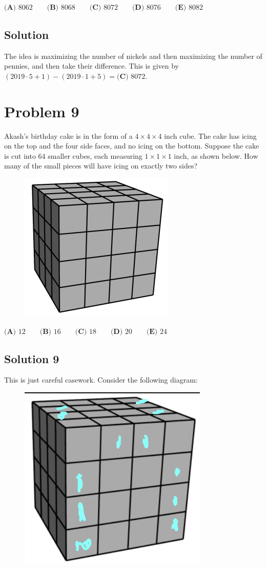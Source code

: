 \documentclass{article}
\begin{document}
$\textbf{(A) }8062 \qquad \textbf{(B) }8068 \qquad \textbf{(C) }8072 \qquad \textbf{(D) }8076 \qquad \textbf{(E) }8082$
\subsection{Solution}
The idea is maximizing the number of nickels and then maximizing the number of pennies, and then take their difference. This is given by $(2019\cdot 5+1)-(2019\cdot 1+5)=\textbf{(C) }8072$.
\section{Problem 9}
Akash's birthday cake is in the form of a $4 \times 4 \times 4$ inch cube. The cake has icing on the top and the four side faces, and no icing on the bottom. Suppose the cake is cut into $64$ smaller cubes, each measuring $1 \times 1 \times 1$ inch, as shown below. How many of the small pieces will have icing on exactly two sides?
\begin{figure}[ht]
\centering
\includegraphics[width=.5\textwidth]{2020 AMC 8 Problem 9.png}

\end{figure}

$\textbf{(A) }12 \qquad \textbf{(B) }16 \qquad \textbf{(C) }18 \qquad \textbf{(D) }20 \qquad \textbf{(E) }24$
\subsection{Solution 9}
This is just careful casework. Consider the following diagram: 
\begin{figure}[ht]
\centering
\includegraphics[width=.5\textwidth]{2020 AMC 8 Solution 9.png}

\end{figure}
\end{document}
